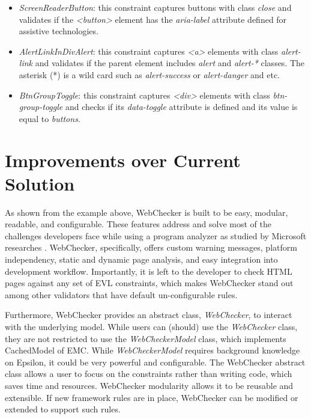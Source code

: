 \documentclass[conference]{IEEETran}
\begin{document}
\begin{itemize}
\item \textit{ScreenReaderButton}: this constraint captures buttons with class \textit{close} and validates if the \textit{<button>} element has the \textit{aria-label} attribute defined for assistive technologies.
\item \textit{AlertLinkInDivAlert}: this constraint captures \textit{<a>} elements with class \textit{alert-link} and validates if the parent element includes \textit{alert} and \textit{alert-*} classes. The asterisk (*) is a wild card such as \textit{alert-success} or \textit{alert-danger} and etc.
\item \textit{BtnGroupToggle}: this constraint captures \textit{<div>} elements with class \textit{btn-group-toggle} and checks if its \textit{data-toggle} attribute is defined and its value is equal to \textit{buttons}.
\end{itemize}

\section{Improvements over Current Solution}
As shown from the example above, WebChecker is built to be easy, modular, readable, and configurable. These features address and solve most of the challenges developers face while using a program analyzer as studied by Microsoft researches \cite{christakis16}. WebChecker, specifically, offers custom warning messages, platform independency, static and dynamic page analysis, and easy integration into development workflow. Importantly, it is left to the developer to check HTML pages against any set of EVL constraints, which makes WebChecker stand out among other validators that have default un-configurable rules.    

Furthermore, WebChecker provides an abstract class, \textit{WebChecker},  to interact with the underlying model. While users can (should) use the \textit{WebChecker} class, they are not restricted to use the \textit{WebCheckerModel} class, which implements CachedModel of EMC. While \textit{WebCheckerModel} requires background knowledge on Epsilon, it could be very powerful and configurable. The WebChecker abstract class allows a user to focus on the constraints rather than writing code, which saves time and resources. WebChecker modularity allows it to be reusable and extensible. If new framework rules are in place, WebChecker can be modified or extended to support such rules. 
\end{document}
